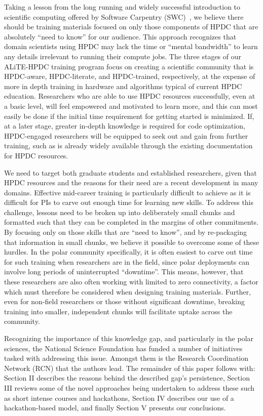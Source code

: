 \documentclass[conference]{IEEEtran}
\begin{document}
Taking a lesson from the long running and widely successful introduction to scientific computing offered by Software Carpentry (SWC)~\cite{Wilson2014-pc}, we believe there should be training materials focused on only those components of HPDC that are absolutely ``need to know'' for our audience. This approach recognizes that domain scientists using HPDC may lack the time or ``mental bandwidth'' to learn any details irrelevant to running their compute jobs. The three stages of our ALiTE-HPDC training program focus on creating a scientific community that is HPDC-aware, HPDC-literate, and HPDC-trained, respectively, at the expense of more in depth training in hardware and algorithms typical of current HPDC education.  Researchers who are able to use HPDC resources successfully, even at a basic level, will feel empowered and motivated to learn more, and this can most easily be done if the initial time requirement for getting started is minimized. If, at a later stage, greater in-depth knowledge is required for code optimization, HPDC-engaged researchers will be equipped to seek out and gain from further training, such as is already widely available through the existing documentation for HPDC resources.


We need to target both graduate students and established researchers, given that HPDC resources and the reasons for their need are a recent development in many domains. Effective mid-career training is particularly difficult to achieve as it is difficult for PIs to carve out enough time for learning new skills. To address this challenge, lessons need to be broken up into deliberately small chunks and formatted such that they can be completed in the margins of other commitments. By focusing only on those skills that are ``need to know'', and by re-packaging that information in small chunks, we believe it possible to overcome some of these hurdles.  In the polar community specifically, it is often easiest to carve out time for such training when researchers are in the field, since polar deployments can involve long periods of uninterrupted ``downtime''.  This means, however, that these researchers are also often working with limited to zero connectivity, a factor which must therefore be considered when designing training materials. Further, even for non-field researchers or those without significant downtime, breaking training into smaller, independent chunks will facilitate uptake across the community.

Recognizing the importance of this knowledge gap, and particularly in the polar sciences, the National Science Foundation has funded a number of initiatives tasked with addressing this issue.  Amongst them is the Research Coordination Network (RCN) that the authors lead. The remainder of this paper follows with: Section II describes the reasons behind the described gap's persistence, Section III reviews some of the novel approaches being undertaken to address these such as short intense courses and hackathons, Section IV describes our use of a hackathon-based model, and finally Section V presents our conclusions.
\end{document}
